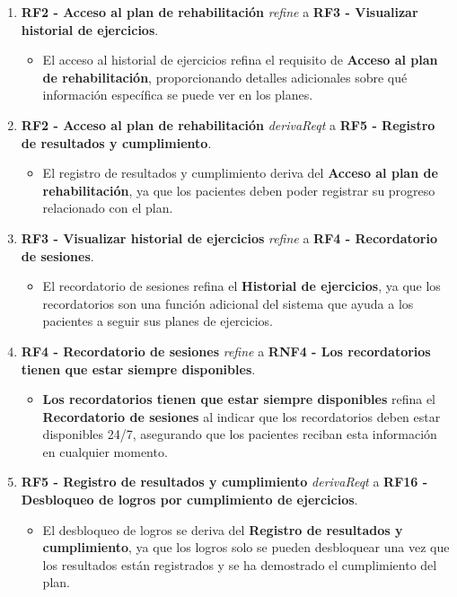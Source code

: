 \documentclass{article}
\begin{document}
\begin{enumerate}
	\item \textbf{RF2 - Acceso al plan de rehabilitación} \textit{refine} a \textbf{RF3 - Visualizar historial de ejercicios}.
	\begin{itemize}
		\item El acceso al historial de ejercicios refina el requisito de \textbf{Acceso al plan de rehabilitación}, proporcionando detalles adicionales sobre qué información específica se puede ver en los planes.
	\end{itemize}
	
	\item \textbf{RF2 - Acceso al plan de rehabilitación} \textit{derivaReqt} a \textbf{RF5 - Registro de resultados y cumplimiento}.
	\begin{itemize}
		\item El registro de resultados y cumplimiento deriva del \textbf{Acceso al plan de rehabilitación}, ya que los pacientes deben poder registrar su progreso relacionado con el plan.
	\end{itemize}
	
	\item \textbf{RF3 - Visualizar historial de ejercicios} \textit{refine} a \textbf{RF4 - Recordatorio de sesiones}.
	\begin{itemize}
		\item El recordatorio de sesiones refina el \textbf{Historial de ejercicios}, ya que los recordatorios son una función adicional del sistema que ayuda a los pacientes a seguir sus planes de ejercicios.
	\end{itemize}
	
	\item \textbf{RF4 - Recordatorio de sesiones} \textit{refine} a \textbf{RNF4 - Los recordatorios tienen que estar siempre disponibles}.
	\begin{itemize}
		\item \textbf{Los recordatorios tienen que estar siempre disponibles} refina el \textbf{Recordatorio de sesiones} al indicar que los recordatorios deben estar disponibles 24/7, asegurando que los pacientes reciban esta información en cualquier momento.
	\end{itemize}
	
	\item \textbf{RF5 - Registro de resultados y cumplimiento} \textit{derivaReqt} a \textbf{RF16 - Desbloqueo de logros por cumplimiento de ejercicios}.
	\begin{itemize}
		\item El desbloqueo de logros se deriva del \textbf{Registro de resultados y cumplimiento}, ya que los logros solo se pueden desbloquear una vez que los resultados están registrados y se ha demostrado el cumplimiento del plan.
	\end{itemize}
	

\end{enumerate}
\end{document}
